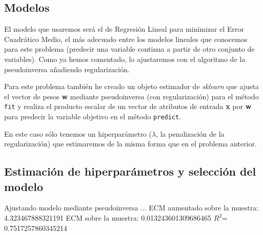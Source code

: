 \documentclass[a4]{article}
\begin{document}
\subsection{Modelos}

El modelo que usaremos será el de Regresión Lineal para minimizar el
Error Cuadrático Medio, el más adecuado entre los modelos lineales que
conocemos para este problema (predecir una variable continua a partir
de otro conjunto de variables). Como ya hemos comentado, lo
ajustaremos con el algoritmo de la pseudoinversa añadiendo
regularización.

Para este problema también he creado un objeto estimador de
\textit{sklearn} que ajusta el vector de pesos \textbf{w} mediante
pseudoinversa (con regularización) para el método \texttt{fit} y
realiza el producto escalar de un vector de atributos de entrada
\textbf{x} por \textbf{w} para predecir la variable objetivo en el
método \texttt{predict}.

En este caso sólo tenemos un hiperparámetro
($\lambda$, la penalización de la regularización) que estimaremos de
la misma forma que en el problema anterior.

\subsection{Estimación de hiperparámetros y selección del modelo}

Ajustando modelo mediante pseudoinversa ...
ECM aumentado sobre la muestra: 4.323467888321191
ECM sobre la muestra: 0.013243601309686465
$R^2$= 0.7517257860345214
\end{document}
